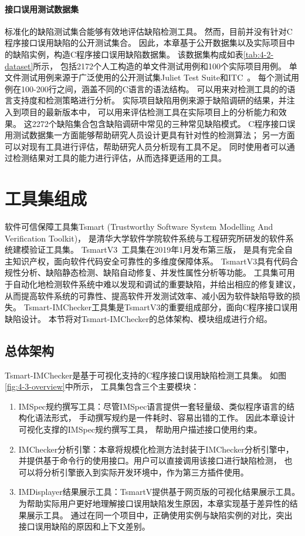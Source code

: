 \paragraph{接口误用测试数据集}
标准化的缺陷测试集合能够有效地评估缺陷检测工具。
然而，目前并没有针对C程序接口误用缺陷的公开测试集合。
因此，本章基于公开数据集以及实际项目中的缺陷实例，构造C程序接口误用缺陷数据集。
该数据集构成如表\ref{tab:4-2-dataset}所示，
包括2172个人工构造的单文件测试用例和100个实际项目用例。
单文件测试用例来源于广泛使用的公开测试集Juliet Test Suite和ITC~\cite{itc}。
每个测试用例在100-200行之间，涵盖不同的C语言的语法结构。
可以用来对检测工具的的语言支持度和检测策略进行分析。
实际项目缺陷用例来源于缺陷调研的结果，并注入到项目的最新版本中，
可以用来评估检测工具在实际项目上的分析能力和效果。
这2272个缺陷集合包含缺陷调研中常见的三种常见缺陷模式。
C程序接口误用测试数据集一方面能够帮助研究人员设计更具有针对性的检测算法；
另一方面可以对现有工具进行评估，帮助研究人员分析现有工具不足。
同时使用者可以通过检测结果对工具的能力进行评估，从而选择更适用的工具。


\section{工具集组成}
\label{sec:4.3}
软件可信保障工具集Tsmart (Trustworthy Software System Modelling And Verification Toolkit)，
是清华大学软件学院软件系统与工程研究所研发的软件系统建模验证工具集。
TsmartV3~\cite{tsmart}工具集在2019年1月发布第三版，
是具有完全自主知识产权，面向软件代码安全可靠性的多维度保障体系。
TsmartV3具有代码合规性分析、缺陷静态检测、缺陷自动修复、并发性属性分析等功能。
工具集可用于自动化地检测软件系统中难以发现和调试的重要缺陷，并给出相应的修复建议，
从而提高软件系统的可靠性、提高软件开发测试效率、减小因为软件缺陷导致的损失。
Tsmart-IMChecker工具集是TsmartV3的重要组成部分，面向C程序接口误用缺陷设计。
本节将对Tsmart-IMChecker的总体架构、模块组成进行介绍。

\subsection{总体架构}
Tsmart-IMChecker是基于可视化支持的C程序接口误用缺陷检测工具集。
如图\ref{fig:4-3-overview}中所示，
工具集包含三个主要模块：
\begin{enumerate}
	\item IMSpec规约撰写工具：尽管IMSpec语言提供一套轻量级、类似程序语言的结构化语法形式，
	手动撰写规约是一件耗时、容易出错的工作。
	因此本章设计可视化支撑的IMSpec规约撰写工具，
	帮助用户描述接口使用约束。
	\item IMChecker分析引擎：本章将规模化检测方法封装于IMChecker分析引擎中，
	并提供基于命令行的使用接口。用户可以直接调用该接口进行缺陷检测，
	也可以将分析引擎嵌入到实际开发环境中，作为第三方插件使用。
	\item IMDisplayer结果展示工具：TsmartV提供基于网页版的可视化结果展示工具。
	为帮助实际用户更好地理解接口误用缺陷发生原因，本章实现基于差异性的结果展示工具。
	通过在同一个项目中，正确使用实例与缺陷实例的对比，突出接口误用缺陷的原因和上下文差别。
\end{enumerate}

